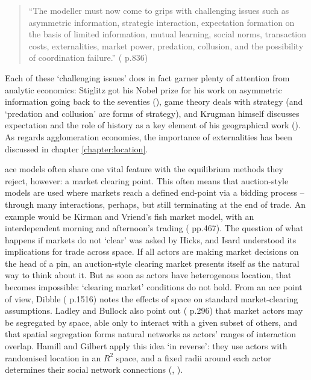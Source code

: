 \begin{quote}
``The modeller must now come to grips with challenging issues such as asymmetric information, strategic interaction, expectation formation on the basis of limited information, mutual learning, social norms, transaction costs, externalities, market power, predation, collusion, and the possibility of coordination failure.'' (\citealt{tesfatsion_agent-based_2006} p.836)
\end{quote}

Each of these `challenging issues' does in fact garner plenty of attention from analytic economics: Stiglitz got his Nobel prize for his work on asymmetric information going back to the seventies (\citealt{rothschild_equilibrium_1976}), game theory deals with strategy (and `predation and collusion' are forms of strategy), and Krugman himself discusses expectation and the role of history  as a key element of his geographical work (\citealt{krugman_history_1991}). As regards agglomeration economies, the importance of externalities has been discussed in chapter \ref{chapter:location}. 

\gls{ace} models often share one vital feature with the equilibrium methods they reject, however: a market clearing point. This often means that auction-style models are used where markets reach a defined end-point via a bidding process – through many interactions, perhaps, but still terminating at the end of trade. An example would be Kirman and Vriend's fish market model, with an interdependent morning and afternoon's trading (\citealt{kirman_evolving_2001} pp.467). The question of what happens if markets do not `clear' was asked by Hicks, and Isard understood its implications for trade across space. If all actors are making market decisions on the head of a pin, an auction-style clearing market presents itself as the natural way to think about it. But as soon as actors have heterogenous location, that becomes impossible: `clearing market' conditions do not hold. From an \gls{ace} point of view, Dibble (\citeyear{dibble_computational_2006} p.1516) notes the effects of space on standard market-clearing assumptions. Ladley and Bullock also point out (\citeyear{ladley_strategic_2008} p.296) that market actors may be segregated by space, able only to interact with a given subset of others, and that spatial segregation forms natural networks as actors' ranges of interaction overlap. Hamill and Gilbert apply this idea `in reverse': they use actors with randomised location in an $R^2$ space, and a fixed radii around each actor determines their social network connections (\citealt{hamill_social_2009}, \citeyear{hamill_simulating_2010}). 


